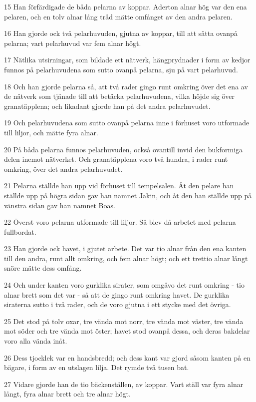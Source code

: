\par 15 Han förfärdigade de båda pelarna av koppar. Aderton alnar hög var den ena pelaren, och en tolv alnar lång tråd mätte omfånget av den andra pelaren.
\par 16 Han gjorde ock två pelarhuvuden, gjutna av koppar, till att sätta ovanpå pelarna; vart pelarhuvud var fem alnar högt.
\par 17 Nätlika utsirningar, som bildade ett nätverk, hängprydnader i form av kedjor funnos på pelarhuvudena som sutto ovanpå pelarna, sju på vart pelarhuvud.
\par 18 Och han gjorde pelarna så, att två rader gingo runt omkring över det ena av de nätverk som tjänade till att betäcka pelarhuvudena, vilka höjde sig över granatäpplena; och likadant gjorde han på det andra pelarhuvudet.
\par 19 Och pelarhuvudena som sutto ovanpå pelarna inne i förhuset voro utformade till liljor, och mätte fyra alnar.
\par 20 På båda pelarna funnos pelarhuvuden, också ovantill invid den bukformiga delen inemot nätverket. Och granatäpplena voro två hundra, i rader runt omkring, över det andra pelarhuvudet.
\par 21 Pelarna ställde han upp vid förhuset till tempelsalen. Åt den pelare han ställde upp på högra sidan gav han namnet Jakin, och åt den han ställde upp på vänstra sidan gav han namnet Boas.
\par 22 Överst voro pelarna utformade till liljor. Så blev då arbetet med pelarna fullbordat.
\par 23 Han gjorde ock havet, i gjutet arbete. Det var tio alnar från den ena kanten till den andra, runt allt omkring, och fem alnar högt; och ett trettio alnar långt snöre mätte dess omfång.
\par 24 Och under kanten voro gurklika sirater, som omgåvo det runt omkring - tio alnar brett som det var - så att de gingo runt omkring havet. De gurklika siraterna sutto i två rader, och de voro gjutna i ett stycke med det övriga.
\par 25 Det stod på tolv oxar, tre vända mot norr, tre vända mot väster, tre vända mot söder och tre vända mot öster; havet stod ovanpå dessa, och deras bakdelar voro alla vända inåt.
\par 26 Dess tjocklek var en handsbredd; och dess kant var gjord såsom kanten på en bägare, i form av en utslagen lilja. Det rymde två tusen bat.
\par 27 Vidare gjorde han de tio bäckenställen, av koppar. Vart ställ var fyra alnar långt, fyra alnar brett och tre alnar högt.
